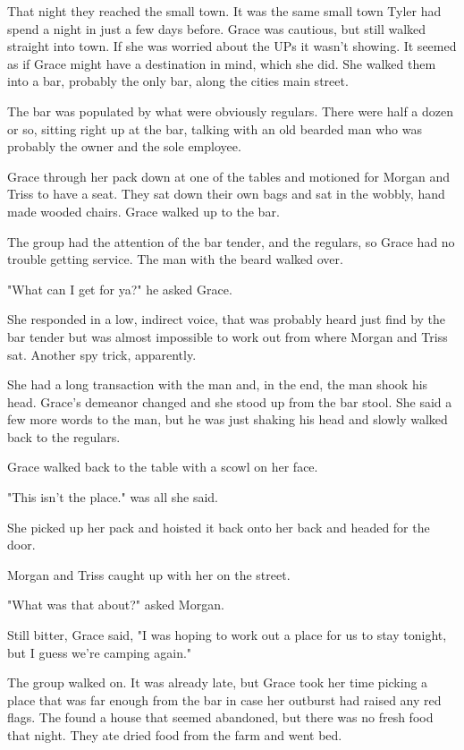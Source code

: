 \documentclass[courier]{sffms}
\begin{document}
That night they reached the small town. It was the same 
small town Tyler had spend a night in just a few days
before. Grace was cautious, but still walked straight
into town. If she was worried about the UPs it wasn't
showing. It seemed as if Grace might have a destination
in mind, which she did. She walked them into a bar, 
probably the only bar, along the cities main street.

The bar was populated by what were obviously regulars.
There were half a dozen or so, sitting right up at the bar,
talking with an old bearded man who was probably the
owner and the sole employee.

Grace through her pack down at one of the tables and
motioned for Morgan and Triss to have a seat. They
sat down their own bags and sat in the wobbly, hand made
wooded chairs. Grace walked up to the bar.

The group had the attention of the bar tender, and the
regulars, so Grace had no trouble getting service. The
man with the beard walked over.

"What can I get for ya?" he asked Grace.

She responded in a low, indirect voice, that was probably
heard just find by the bar tender but was almost
impossible to work out from where Morgan and Triss
sat. Another spy trick, apparently.

She had a long transaction with the man and, in the end,
the man shook his head. Grace's demeanor changed and
she stood up from the bar stool. She said a few more
words to the man, but he was just shaking his head and
slowly walked back to the regulars.

Grace walked back to the table with a scowl on her face.

"This isn't the place." was all she said.

She picked up her pack and hoisted it back onto her
back and headed for the door.

Morgan and Triss caught up with her on the street.

"What was that about?" asked Morgan.

Still bitter, Grace said, "I was hoping to work out a
place for us to stay tonight, but I guess we're camping
again."

The group walked on. It was already late, but Grace
took her time picking a place that was far enough from
the bar in case her outburst had raised any red flags.
The found a house that seemed abandoned, but there
was no fresh food that night. They ate dried food from
the farm and went bed.
\end{document}
